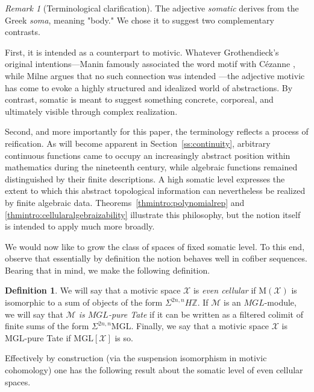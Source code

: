 \documentclass[11pt,leqno]{article}
\newcommand{\Z}{{\mathbb Z}}
\renewcommand{\1}{{\rm 1\hspace*{-0.4ex}%
\rule{0.1ex}{1.52ex}\hspace*{0.2ex}}}
\newcommand{\<}[1]{{\langle}#1 {\rangle}}
\newcounter{intro}
\theoremstyle{plain}
\theoremstyle{definition}
\newtheorem{defn}[theorem]{Definition}
\theoremstyle{remark}
\newtheorem{rem}[theorem]{Remark}
\numberwithin{equation}{subsection}
\begin{document}
\begin{rem}[Terminological clarification]
The adjective {\em somatic} derives from the Greek {\em soma}, meaning "body." We chose it to suggest two complementary contrasts.

First, it is intended as a counterpart to motivic. Whatever Grothendieck's original intentions—Manin famously associated the word motif with C\'ezanne \cite[p. 440]{Manin1968}, while Milne argues that no such connection was intended \cite{MilneMotivesOnline}—the adjective motivic has come to evoke a highly structured and idealized world of abstractions. By contrast, somatic is meant to suggest something concrete, corporeal, and ultimately visible through complex realization.

Second, and more importantly for this paper, the terminology reflects a process of reification. As will become apparent in Section~\ref{ss:continuity}, arbitrary continuous functions came to occupy an increasingly abstract position within mathematics during the nineteenth century, while algebraic functions remained distinguished by their finite descriptions. A high somatic level expresses the extent to which this abstract topological information can nevertheless be realized by finite algebraic data. Theorems~\ref{thmintro:polynomialrep} and \ref{thmintro:cellularalgebraizability} illustrate this philosophy, but the notion itself is intended to apply much more broadly.
\end{rem}

We would now like to grow the class of spaces of fixed somatic level.  To this end, observe that essentially by definition the notion behaves well in cofiber sequences.  Bearing that in mind, we make the following definition.

\begin{defn}
	\label{defn:evencellular}
	We will say that a motivic space $\mathscr{X}$ is {\em even cellular} if $\mathrm{M}(\mathscr{X})$ is isomorphic to a sum of objects of the form $\Sigma^{2n,n}H\Z$.  If $\mathscr{M}$ is an $MGL$-module, we will say that {\em $\mathscr{M}$ is $MGL$-pure Tate} if it can be written as a filtered colimit of finite sums of the form $\Sigma^{2n,n} \mathrm{MGL}$.  Finally, we say that a motivic space $\mathscr{X}$ is $\mathrm{MGL}$-pure Tate if $\mathrm{MGL}[\mathscr{X}]$ is so.
\end{defn}

Effectively by construction (via the suspension isomorphism in motivic cohomology) one has the following result about the somatic level of even cellular spaces.
\end{document}
